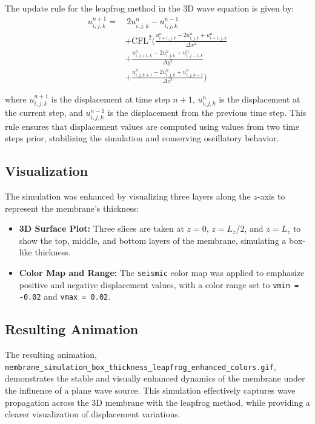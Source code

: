 \documentclass{article}
\begin{document}
The update rule for the leapfrog method in the 3D wave equation is given by:
\begin{align}
u_{i,j,k}^{n+1} = &\ 2 u_{i,j,k}^{n} - u_{i,j,k}^{n-1} \nonumber \\
& + \text{CFL}^2 \Bigg( \frac{u_{i+1, j, k}^n - 2 u_{i, j, k}^n + u_{i-1, j, k}^n}{\Delta x^2} \nonumber \\
& + \frac{u_{i, j+1, k}^n - 2 u_{i, j, k}^n + u_{i, j-1, k}^n}{\Delta y^2} \nonumber \\
& + \frac{u_{i, j, k+1}^n - 2 u_{i, j, k}^n + u_{i, j, k-1}^n}{\Delta z^2} \Bigg)
\end{align}

where $u_{i,j,k}^{n+1}$ is the displacement at time step $n+1$, $u_{i,j,k}^{n}$ is the displacement at the current step, and $u_{i,j,k}^{n-1}$ is the displacement from the previous time step. This rule ensures that displacement values are computed using values from two time steps prior, stabilizing the simulation and conserving oscillatory behavior.

\subsection{Visualization}

The simulation was enhanced by visualizing three layers along the $z$-axis to represent the membrane's thickness:
\begin{itemize}
    \item \textbf{3D Surface Plot:} Three slices are taken at $z = 0$, $z = L_z / 2$, and $z = L_z$ to show the top, middle, and bottom layers of the membrane, simulating a box-like thickness.
    \item \textbf{Color Map and Range:} The \texttt{seismic} color map was applied to emphasize positive and negative displacement values, with a color range set to \texttt{vmin = -0.02} and \texttt{vmax = 0.02}.
\end{itemize}

\subsection{Resulting Animation}

The resulting animation, \texttt{membrane\_simulation\_box\_thickness\_leapfrog\_enhanced\_colors.gif}, demonstrates the stable and visually enhanced dynamics of the membrane under the influence of a plane wave source. This simulation effectively captures wave propagation across the 3D membrane with the leapfrog method, while providing a clearer visualization of displacement variations.
\end{document}
